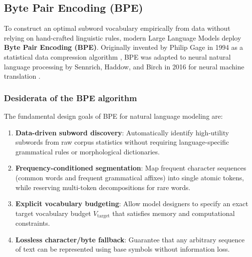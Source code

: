 \documentclass[../../../main.tex]{subfiles}
\begin{document}
\subsection{Byte Pair Encoding (BPE)}
\label{subsec:bpe_deep_mechanics}

To construct an optimal subword vocabulary empirically from data without relying on hand-crafted linguistic rules, modern Large Language Models deploy \textbf{Byte Pair Encoding (BPE)}. Originally invented by Philip Gage in 1994 as a statistical data compression algorithm \cite{gage1994}, BPE was adapted to neural natural language processing by Sennrich, Haddow, and Birch in 2016 for neural machine translation \cite{sennrich2016}.

\subsubsection{Desiderata of the BPE algorithm}
The fundamental design goals of BPE for natural language modeling are:
\begin{enumerate}
    \item \textbf{Data-driven subword discovery}: Automatically identify high-utility subwords from raw corpus statistics without requiring language-specific grammatical rules or morphological dictionaries.
    \item \textbf{Frequency-conditioned segmentation}: Map frequent character sequences (common words and frequent grammatical affixes) into single atomic tokens, while reserving multi-token decompositions for rare words.
    \item \textbf{Explicit vocabulary budgeting}: Allow model designers to specify an exact target vocabulary budget $V_{\text{target}}$ that satisfies memory and computational constraints.
    \item \textbf{Lossless character/byte fallback}: Guarantee that any arbitrary sequence of text can be represented using base symbols without information loss.
\end{enumerate}
\end{document}
